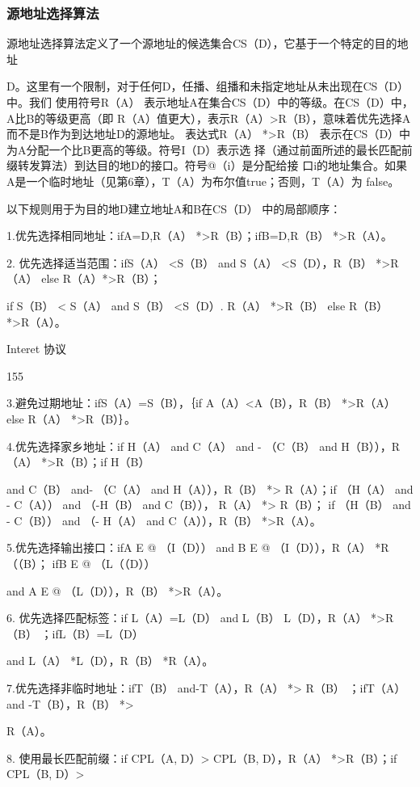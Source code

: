 \subsubsection{源地址选择算法}
源地址选择算法定义了一个源地址的候选集合CS（D），它基于一个特定的目的地址

D。这里有一个限制，对于任何D，任播、组播和未指定地址从未出现在CS（D）中。我们
使用符号R（A） 表示地址A在集合CS（D）中的等级。在CS（D）中，A比B的等级更高（即
R（A）值更大），表示R（A）>R（B），意味着优先选择A 而不是B作为到达地址D的源地址。
表达式R（A） *>R（B） 表示在CS（D）中为A分配一个比B更高的等级。符号I（D）表示选
择（通过前面所述的最长匹配前缀转发算法）到达目的地D的接口。符号@（i）是分配给接
口i的地址集合。如果A是一个临时地址（见第6章），T（A）为布尔值true；否则，T（A）为
false。

以下规则用于为目的地D建立地址A和B在CS（D） 中的局部顺序：

1.优先选择相同地址：ifA=D,R（A） *>R（B）；ifB=D,R（B） *>R（A）。

2. 优先选择适当范围：ifS（A） <S（B） and S（A） <S（D），R（B） *>R（A） else R（A）*>R（B）；

if S（B） < S（A） and S（B） <S（D）. R（A） *>R（B） else R（B） *>R（A）。

Interet 协议

155

3.避免过期地址：ifS（A）=S（B），｛if A（A）<A（B），R（B） *>R（A） else R（A） *>R（B）｝。

4.优先选择家乡地址：if H（A） and C（A） and - （C（B） and H（B）），R（A） *>R（B）；if H（B）

and C（B） and- （C（A） and H（A）），R（B） *> R（A）；if （H（A） and - C（A）） and （-H（B） and C（B）），
R（A） *> R（B）； if （H（B） and - C（B）） and （- H（A） and C（A）），R（B） *>R（A）。

5.优先选择输出接口：ifA E @ （I（D）） and B E @ （I（D）），R（A） *R（（B）； ifB E @ （L（（D））

and A E @ （L（D）），R（B） *>R（A）。

6. 优先选择匹配标签：if L（A）=L（D） and L（B） L（D），R（A） *>R（B） ；ifL（B）=L（D）

and L（A） *L（D），R（B） *R（A）。

7.优先选择非临时地址：ifT（B） and-T（A），R（A） *> R（B） ；ifT（A） and -T（B），R（B） *>

R（A）。

8. 使用最长匹配前缀：if CPL（A, D）> CPL（B, D），R（A） *>R（B）；if CPL（B, D）>

